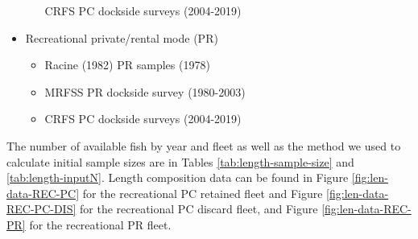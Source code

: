 \documentclass[11pt,
  english,
]{article}
\begin{document}
\begin{itemize}
\begin{itemize}

    CRFS PC dockside surveys (2004-2019)

    \tagmcend\tagstructend\tagstructend

    \tagmcend\tagstructend\tagstructend
  \end{itemize}

  \tagstructend
\item

  Recreational private/rental mode (PR)

  \tagmcend\tagstructend\tagstructend


  \begin{itemize}
  \item


    Racine (1982) PR samples (1978)

    \tagmcend\tagstructend\tagstructend

    \tagmcend\tagstructend\tagstructend
  \item


    MRFSS PR dockside survey (1980-2003)

    \tagmcend\tagstructend\tagstructend

    \tagmcend\tagstructend\tagstructend
  \item


    CRFS PC dockside surveys (2004-2019)

    \tagmcend\tagstructend\tagstructend

    \tagmcend\tagstructend\tagstructend
  \end{itemize}

  \tagstructend
\end{itemize}

\tagstructend

The number of available fish by year and fleet as well as the method we used to calculate initial sample sizes are in Tables \ref{tab:length-sample-size} and \ref{tab:length-inputN}. Length composition data can be found in Figure \ref{fig:len-data-REC-PC} for the recreational PC retained fleet and Figure \ref{fig:len-data-REC-PC-DIS} for the recreational PC discard fleet, and Figure \ref{fig:len-data-REC-PR} for the recreational PR fleet.
\end{document}
